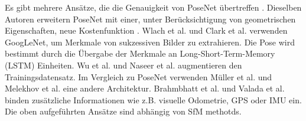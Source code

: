 Es gibt mehrere Ansätze, die die Genauigkeit von PoseNet übertreffen .
Dieselben Autoren erweitern PoseNet mit einer, unter Berücksichtigung von geometrischen Eigenschaften, neue Kostenfunktion \cite{kendallGeometricLossFunctions2017}. Wlach et al. \cite{walchImagebasedLocalizationUsing2016} und Clark et al. \cite{clarkVidLocDeepSpatioTemporal2017} verwenden GoogLeNet, um Merkmale von sukzessiven Bilder zu extrahieren. Die Pose wird bestimmt durch die Übergabe der Merkmale an Long-Short-Term-Memory (LSTM) \cite{hochreiterLongShortTermMemory1997a} Einheiten.
Wu et al.\cite{wuDelvingDeeperConvolutional2017}  und  Naseer et al. \cite{naseerDeepRegressionMonocular2017} augmentieren den Trainingsdatensatz. Im Vergleich zu PoseNet verwenden Müller et al. \cite{mullerSQUEEZEPOSENETIMAGEBASED2017} und Melekhov et al.\cite{melekhovImageBasedLocalizationUsing2017} eine andere Architektur. Brahmbhatt et al. \cite{brahmbhattGeometryAwareLearningMaps2018} und Valada et al. \cite{valadaDeepAuxiliaryLearning2018, valadaIncorporatingSemanticGeometric} binden zusätzliche Informationen wie z.B. visuelle Odometrie, GPS oder IMU ein.
Die oben aufgeführten Ansätze sind abhängig von SfM methotds.



% 
